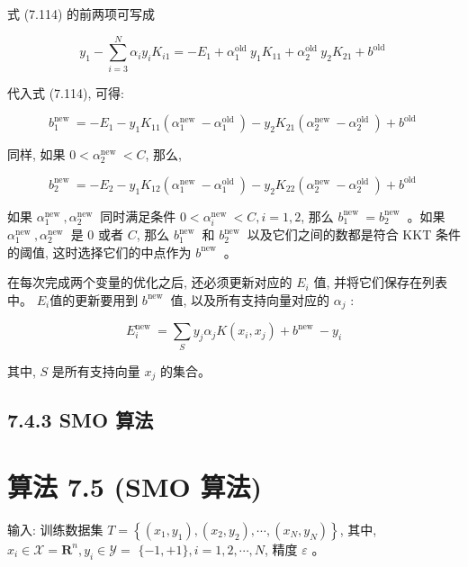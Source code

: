 \documentclass[10pt]{article}
\begin{document}
式 (7.114) 的前两项可写成

$$
y_{1}-\sum_{i=3}^{N} \alpha_{i} y_{i} K_{i 1}=-E_{1}+\alpha_{1}^{\text {old }} y_{1} K_{11}+\alpha_{2}^{\text {old }} y_{2} K_{21}+b^{\text {old }}
$$

代入式 (7.114), 可得:


\begin{equation*}
b_{1}^{\text {new }}=-E_{1}-y_{1} K_{11}\left(\alpha_{1}^{\text {new }}-\alpha_{1}^{\text {old }}\right)-y_{2} K_{21}\left(\alpha_{2}^{\text {new }}-\alpha_{2}^{\text {old }}\right)+b^{\text {old }} \tag{7.115}
\end{equation*}


同样, 如果 $0<\alpha_{2}^{\text {new }}<C$, 那么,


\begin{equation*}
b_{2}^{\text {new }}=-E_{2}-y_{1} K_{12}\left(\alpha_{1}^{\text {new }}-\alpha_{1}^{\text {old }}\right)-y_{2} K_{22}\left(\alpha_{2}^{\text {new }}-\alpha_{2}^{\text {old }}\right)+b^{\text {old }} \tag{7.116}
\end{equation*}


如果 $\alpha_{1}^{\text {new }}, \alpha_{2}^{\text {new }}$ 同时满足条件 $0<\alpha_{i}^{\text {new }}<C, i=1,2$, 那么 $b_{1}^{\text {new }}=b_{2}^{\text {new }}$ 。如果 $\alpha_{1}^{\text {new }}, \alpha_{2}^{\text {new }}$ 是 0 或者 $C$, 那么 $b_{1}^{\text {new }}$ 和 $b_{2}^{\text {new }}$ 以及它们之间的数都是符合 KKT 条件的阈值, 这时选择它们的中点作为 $b^{\text {new }}$ 。

在每次完成两个变量的优化之后, 还必须更新对应的 $E_{i}$ 值, 并将它们保存在列表中。 $E_{i}$值的更新要用到 $b^{\text {new }}$ 值, 以及所有支持向量对应的 $\alpha_{j}$ :


\begin{equation*}
E_{i}^{\text {new }}=\sum_{S} y_{j} \alpha_{j} K\left(x_{i}, x_{j}\right)+b^{\text {new }}-y_{i} \tag{7.117}
\end{equation*}


其中, $S$ 是所有支持向量 $x_{j}$ 的集合。

\subsection*{7.4.3 SMO 算法}
\section*{算法 7.5 (SMO 算法)}
输入: 训练数据集 $T=\left\{\left(x_{1}, y_{1}\right),\left(x_{2}, y_{2}\right), \cdots,\left(x_{N}, y_{N}\right)\right\}$, 其中, $x_{i} \in \mathcal{X}=\boldsymbol{R}^{n}, y_{i} \in \mathcal{Y}=$ $\{-1,+1\}, i=1,2, \cdots, N$, 精度 $\varepsilon$ 。
\end{document}
